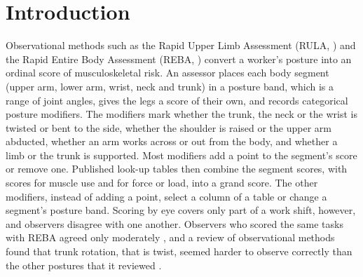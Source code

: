 \documentclass[review,3p,authoryear]{elsarticle}
\begin{document}
\section{Introduction}
\label{sec:intro}
Observational methods such as the Rapid Upper Limb Assessment (RULA,
\citealp{mcatamney1993rula}) and the Rapid Entire Body Assessment (REBA,
\citealp{hignett2000reba}) convert a worker's posture into an ordinal score of
musculoskeletal risk. An assessor places each body segment (upper arm, lower arm, wrist, neck and trunk) in a
posture band, which is a range of joint angles, gives the legs a score of their own, and
records categorical posture modifiers. The modifiers mark whether the trunk, the neck or the wrist is twisted
or bent to the side, whether the shoulder is raised or the upper arm abducted, whether an arm works across or
out from the body, and whether a limb or the trunk is supported. Most modifiers add a point to the segment's score or remove one.
Published look-up tables then combine the segment scores, with scores for muscle use and
for force or load, into a grand score. The other modifiers, instead of adding a point,
select a column of a table or change a segment's posture band. Scoring by eye covers only part of a work
shift, however, and observers disagree with one another. Observers who scored the same
tasks with REBA agreed only moderately \citep{schwartz2019reba}, and a review of
observational methods found that trunk rotation, that is twist, seemed harder to observe
correctly than the other postures that it reviewed \citep{takala2010observational}.
\end{document}
